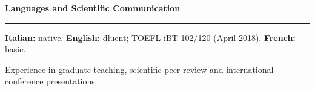 \documentclass[10pt,a4paper]{article}
\newcommand{\cvsection}[1]{%
    \Needspace{4\baselineskip}%
    \vspace{0.8em}%
    {\large\bfseries\color{accent} #1}\par
    \vspace{0.2em}\hrule\vspace{0.45em}%
}
\begin{document}
    \cvsection{Languages and Scientific Communication}

    \textbf{Italian:} native.
    \hfill
    \textbf{English:} dluent; TOEFL iBT 102/120 (April 2018).
    \hfill
    \textbf{French:} basic.\par
    Experience in graduate teaching, scientific peer review and international
    conference presentations.
\end{document}
